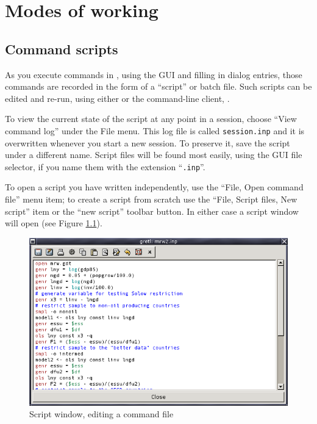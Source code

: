 \chapter{Modes of working}
\label{modes}

\section{Command scripts}
\label{scripts}

As you execute commands in , using the GUI and filling in
dialog entries, those commands are recorded in the form of a
``script'' or batch file.  Such scripts can be edited and re-run,
using either  or the command-line client, .

To view the current state of the script at any point in a 
session, choose ``View command log'' under the File menu. This log
file is called \verb+session.inp+ and it is overwritten whenever you
start a new session.  To preserve it, save the script under a
different name.  Script files will be found most easily, using the GUI
file selector, if you name them with the extension ``\verb+.inp+''.

To open a script you have written independently, use the ``File, Open
command file'' menu item; to create a script from scratch use the
``File, Script files, New script'' item or the ``new script'' toolbar button.
In either case a script window will open (see Figure
\ref{fig-scriptwin}).

\begin{figure}[htbp]
  \begin{center}
    \includegraphics[scale=0.5]{figures/scriptwin}
  \end{center}
  \caption{Script window, editing a command file}
  \label{fig-scriptwin}
\end{figure}


